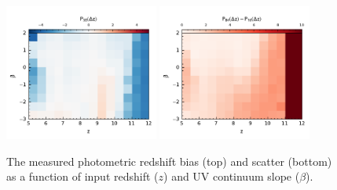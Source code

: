 \begin{figure}
	\centering
	\includegraphics[width=0.45\textwidth]{./figures/beta_bias.pdf}
  \includegraphics[width=0.45\textwidth]{./figures/beta_scatter.pdf}
	\caption{The measured photometric redshift bias (top) and scatter (bottom) as a function of input redshift ($z$) and UV continuum slope ($\beta$). \label{fig:beta_bias_scatter}}
\end{figure}
